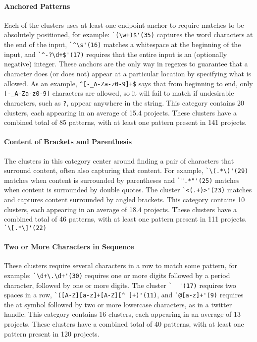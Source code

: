 \paragraph{Anchored Patterns}
Each of the clusters uses at least one endpoint anchor to require matches to be absolutely positioned, for example:
\verb!`(\w+)$'(35)! captures the word characters at the end of the input, \verb!`^\s'(16)! matches a whitespace at the beginning of the input, and \verb!`^-?\d+$'(17)! requires that the entire input is an (optionally negative) integer.
These anchors are the only way in regexes to guarantee that a character does (or does not) appear at a particular location by specifying what is allowed. As an example, \verb!^[-_A-Za-z0-9]+$! says that from beginning to end, only \verb![-_A-Za-z0-9]! characters are allowed, so it will fail to match if undesirable characters, such as \verb!?!, appear anywhere in the string.
This category contains 20 clusters, each appearing in an average of 15.4 projects.
These clusters have a combined total of 85 patterns, with at least one pattern present in 141 projects.

\paragraph{Content of Brackets and Parenthesis}
\label{cluster:contentparens}
The clusters in this category center around finding a pair of characters that surround content, often also capturing that content. For example,
\verb!`\(.*\)'(29)! matches when content is surrounded by parentheses and \verb!`".*"'(25)! matches  when content is surrounded by double quotes.  The cluster \verb!`<(.+)>'(23)! matches and captures content surrounded by angled brackets.
This category contains 10 clusters, each appearing in an average of 18.4 projects.
 These clusters have a combined total of 46 patterns, with at least one pattern present in 111 projects.
\verb!`\[.*\]'(22)!

\paragraph{Two or More Characters in Sequence}
\label{cluster:multiple}
These clusters require several characters in a row to match some pattern, for example:
\verb!`\d+\.\d+'(30)! requires one or more digits followed by a period character, followed by one or more digits.  The cluster \verb!`  '(17)! requires two spaces in a row,
\verb!`([A-Z][a-z]+[A-Z][^ ]+)'(11)!,
and \verb!`@[a-z]+'(9)! requires the at symbol followed by two or more lowercase characters, as in a twitter handle.
This category contains 16 clusters, each appearing in an average of 13 projects.
These clusters have a combined total of 40 patterns, with at least one pattern present in 120 projects.

